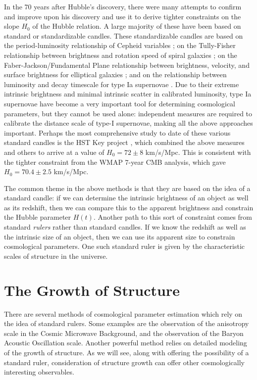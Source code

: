 In the 70 years after Hubble's discovery, there were many attempts to
confirm and improve upon his discovery and use it to derive tighter
constraints on the slope $H_0$ of the Hubble relation.  A large majority
of these have
been based on standard or standardizable candles.  These standardizable
candles are based on the period-luminosity relationship of Cepheid
variables \citep{Leavitt1912}; on the Tully-Fisher relationship between
brightness and rotation speed of spiral galaxies \citep{Tully77}; on
the Faber-Jackson/Fundamental Plane relationship between brightness,
velocity, and surface brightness for elliptical galaxies
\citep{Faber76, Djorgovski87}; and on the relationship between luminosity
and decay timescale for type Ia supernovae \citep{Philips93}.  Due to
their extreme intrinsic brightness and minimal intrinsic scatter in
calibrated luminosity, type Ia supernovae have become a very important
tool for determining cosmological parameters, but they cannot be used
alone: independent measures are required to calibrate the distance
scale of type-I supernovae, making all the above approaches important.
Perhaps the most comprehensive study to date of these various standard
candles is the HST Key project \citep{Freedman01}, which combined
the above measures and others to arrive
at a value of $H_0 = 72 \pm 8$ km/s/Mpc.  This is consistent with the
tighter constraint from the WMAP 7-year CMB analysis, which gave
$H_0 = 70.4 \pm 2.5$ km/s/Mpc.

The common theme in the above methods is that they are based on the idea
of a standard candle: if we can determine the intrinsic brightness
of an object as well as its redshift, then we can compare this to the
apparent brightness and constrain the Hubble parameter $H(t)$.
Another path to this sort of constraint comes from standard {\it rulers}
rather than standard candles.  If we know the redshift as well as the
intrinsic size of an object, then we can use its apparent size to
constrain cosmological parameters.  One such standard ruler is given by the
characteristic scales of structure in the universe.

\section{The Growth of Structure}
\label{sec:growth}
There are several methods of cosmological parameter estimation which rely
on the idea of standard rulers.  Some examples are the observation of the
anisotropy scale in the Cosmic Microwave Background, and the observation
of the Baryon Acoustic Oscillation scale.
Another powerful method relies on detailed modeling of the growth of structure.
As we will see, along with offering the possibility of a standard ruler,
consideration of structure growth can offer other cosmologically interesting
observables.

